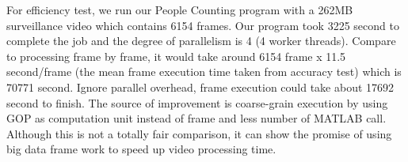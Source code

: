 For efficiency test, we run our People Counting program with a 262MB surveillance
video which contains 6154 frames. Our program took 3225 second to complete the
job and the degree of parallelism is 4 (4 worker threads). Compare to processing
frame by frame, it would take around 6154 frame x 11.5 second/frame (the mean
frame execution time taken from accuracy test) which is 70771 second. Ignore
parallel overhead, frame execution could take about 17692 second to finish. The
source of improvement is coarse-grain execution by using GOP as computation unit
instead of frame and less number of MATLAB call. Although this is not a totally
fair comparison, it can show the promise of using big data frame work to speed
up video processing time.

